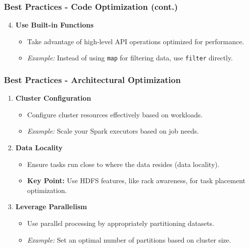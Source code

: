 \documentclass[aspectratio=169]{beamer}
\begin{document}
\begin{frame}[fragile]
    \frametitle{Best Practices - Code Optimization (cont.)}
    \begin{enumerate}
        \setcounter{enumi}{3}
        \item \textbf{Use Built-in Functions}
        \begin{itemize}
            \item Take advantage of high-level API operations optimized for performance.
            \item \textit{Example:} Instead of using \texttt{map} for filtering data, use \texttt{filter} directly.
        \end{itemize}
    \end{enumerate}
\end{frame}

\begin{frame}[fragile]
    \frametitle{Best Practices - Architectural Optimization}
    \begin{enumerate}
        \item \textbf{Cluster Configuration}
        \begin{itemize}
            \item Configure cluster resources effectively based on workloads.
            \item \textit{Example:} Scale your Spark executors based on job needs.
        \end{itemize}

        \item \textbf{Data Locality}
        \begin{itemize}
            \item Ensure tasks run close to where the data resides (data locality).
            \item \textbf{Key Point:} Use HDFS features, like rack awareness, for task placement optimization.
        \end{itemize}
        
        \item \textbf{Leverage Parallelism}
        \begin{itemize}
            \item Use parallel processing by appropriately partitioning datasets.
            \item \textit{Example:} Set an optimal number of partitions based on cluster size.
        \end{itemize}
    \end{enumerate}
\end{frame}
\end{document}
